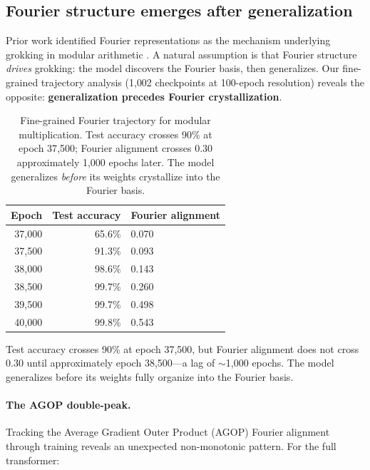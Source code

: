 \documentclass{article}
\begin{document}
\subsection{Fourier structure emerges after generalization}
\label{sec:fourier_trajectory}

Prior work identified Fourier representations as the mechanism underlying
grokking in modular arithmetic \citep{nanda2023progress, zhong2024clock}.
A natural assumption is that Fourier structure \emph{drives} grokking:
the model discovers the Fourier basis, then generalizes. Our fine-grained
trajectory analysis (1{,}002 checkpoints at 100-epoch resolution) reveals
the opposite: \textbf{generalization precedes Fourier crystallization}.

\begin{table}[t]
\centering
\small
\begin{tabular}{rrl}
\toprule
Epoch & Test accuracy & Fourier alignment \\
\midrule
37{,}000 & 65.6\% & 0.070 \\
37{,}500 & 91.3\% & 0.093 \\
38{,}000 & 98.6\% & 0.143 \\
38{,}500 & 99.7\% & 0.260 \\
39{,}500 & 99.7\% & 0.498 \\
40{,}000 & 99.8\% & 0.543 \\
\bottomrule
\end{tabular}
\caption{Fine-grained Fourier trajectory for modular multiplication.
Test accuracy crosses 90\% at epoch 37{,}500; Fourier alignment crosses 0.30
approximately 1{,}000 epochs later. The model generalizes \emph{before} its
weights crystallize into the Fourier basis.}
\label{tab:fourier_lag}
\end{table}

Test accuracy crosses 90\% at epoch 37{,}500, but Fourier alignment does not
cross 0.30 until approximately epoch 38{,}500---a lag of $\sim$1{,}000
epochs. The model generalizes before its weights fully organize into the
Fourier basis.

\paragraph{The AGOP double-peak.}
Tracking the Average Gradient Outer Product (AGOP) Fourier alignment through
training reveals an unexpected non-monotonic pattern. For the full transformer:
\end{document}
